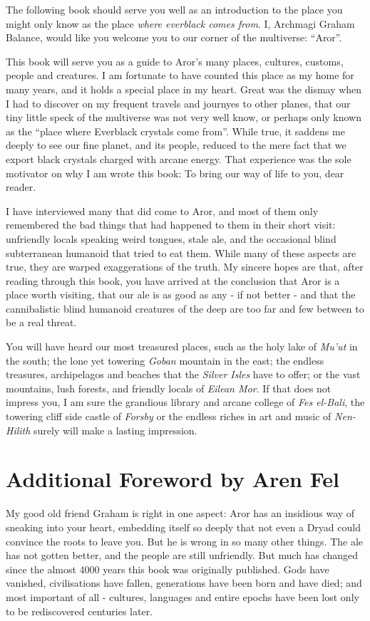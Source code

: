 The following book should serve you well as an introduction to the
place you might only know as the place \emph{where everblack comes
  from}. I, Archmagi Graham Balance, would like you welcome you to
our corner of the multiverse: ``Aror''.

This book will serve you as a guide to Aror's many places, cultures,
customs, people and creatures. I am fortunate to have counted this
place as my home for many years, and it holds a special place in my
heart. Great was the dismay when I had to discover on my frequent
travels and journyes to other planes, that our tiny little speck of
the multiverse was not very well know, or perhaps only known as the
``place where Everblack crystals come from''. While true, it saddens
me deeply to see our fine planet, and its people, reduced to the mere
fact that we export black crystals charged with arcane energy. That
experience was the sole motivator on why I am wrote this book: To bring
our way of life to you, dear reader.

I have interviewed many that did come to Aror, and most of them only
remembered the bad things that had happened to them in their short
visit: unfriendly locals speaking weird tongues, stale ale, and the
occasional blind subterranean humanoid that tried to eat them. While
many of these aspects are true, they are warped exaggerations of the
truth. My sincere hopes are that, after reading through this book, you
have arrived at the conclusion that Aror is a place worth visiting,
that our ale is as good as any - if not better - and that the
cannibalistic blind humanoid creatures of the deep are too far and few
between to be a real threat.

You will have heard our most treasured places, such as the holy lake
of \emph{Mu'ut} in the south; the lone yet towering \emph{Goban}
mountain in the east; the endless treasures, archipelagos and beaches
that the \emph{Silver Isles} have to offer; or the vast mountains,
lush forests, and friendly locals of \emph{Eilean Mor}. If that does
not impress you, I am sure the grandious library and arcane college of
\emph{Fes el-Bali}, the towering cliff side castle of \emph{Forsby} or
the endless riches in art and music of \emph{Nen-Hilith} surely will
make a lasting impression.

\section{Additional Foreword by Aren Fel}

My good old friend Graham is right in one aspect: Aror has an insidious
way of sneaking into your heart, embedding itself so deeply that not
even a Dryad could convince the roots to leave you. But he is wrong in
so many other things. The ale has not gotten better, and the people
are still unfriendly. But much has changed since the almost 4000 years
this book was originally published. Gods have vanished, civilisations
have fallen, generations have been born and have died; and most important
of all - cultures, languages and entire epochs have been lost only to be
rediscovered centuries later.

